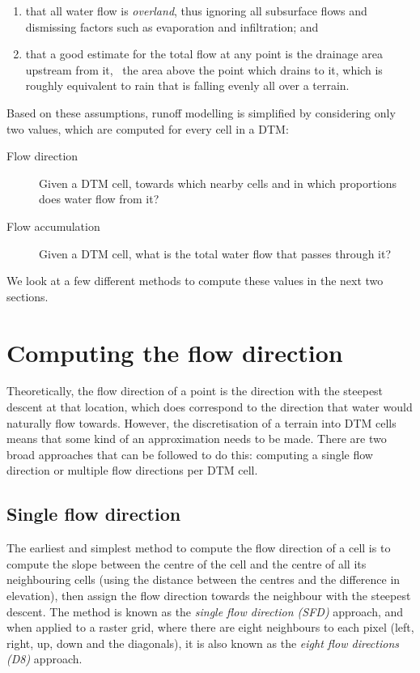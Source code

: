 \begin{enumerate}
\item that all water flow is \emph{overland}, thus ignoring all subsurface flows and dismissing factors such as evaporation and infiltration; and
\item that a good estimate for the total flow at any point is the drainage area upstream from it, \ie\ the area above the point which drains to it, which is roughly equivalent to rain that is falling evenly all over a terrain.
\end{enumerate}

Based on these assumptions, runoff modelling is simplified by considering only two values, which are computed for every cell in a DTM\@:

\begin{description}
\item[Flow direction]
Given a DTM cell, towards which nearby cells and in which proportions does water flow from it?
\item[Flow accumulation]
Given a DTM cell, what is the total water flow that passes through it?
\end{description}

We look at a few different methods to compute these values in the next two sections.

\section{Computing the flow direction}%
\label{se:direction}

Theoretically, the flow direction of a point is the direction with the steepest descent at that location, which does correspond to the direction that water would naturally flow towards.
However, the discretisation of a terrain into DTM cells means that some kind of an approximation needs to be made.
There are two broad approaches that can be followed to do this: computing a single flow direction or multiple flow directions per DTM cell.

\subsection{Single flow direction}


The earliest and simplest method to compute the flow direction of a cell is to compute the slope between the centre of the cell and the centre of all its neighbouring cells (using the distance between the centres and the difference in elevation), then assign the flow direction towards the neighbour with the steepest descent.
The method is known as the \emph{single flow direction (SFD)} approach, and when applied to a raster grid, where there are eight neighbours to each pixel (left, right, up, down and the diagonals), it is also known as the \emph{eight flow directions (D8)} approach.

